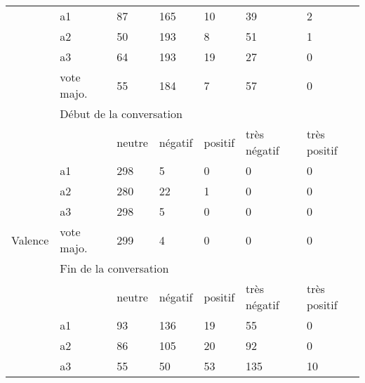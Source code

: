 \begin{table}[]
\begin{tabular}{|l|l|l|l|l|l|l|}
                                      & a1               & 87     & 165     & 10        & 39           & 2                 \\ \cline{2-7}
                                      & a2               & 50     & 193     & 8         & 51           & 1                 \\ \cline{2-7}
                                      & a3               & 64     & 193     & 19        & 27           & 0                 \\ \cline{2-7}
                                      & vote majo. & 55     & 184     & 7         & 57           & 0                 \\ \hline \hline
\multirow{18}{*}{Valence}             & \multicolumn{6}{l|}{Début de la conversation}                                      \\ \cline{2-7}
                                      &                  & neutre & négatif & positif   & très négatif & très positif      \\ \cline{2-7}
                                      & a1               & 298    & 5       & 0         & 0            & 0                 \\ \cline{2-7}
                                      & a2               & 280    & 22      & 1         & 0            & 0                 \\ \cline{2-7}
                                      & a3               & 298    & 5       & 0         & 0            & 0                 \\ \cline{2-7}
                                      & vote majo. & 299    & 4       & 0         & 0            & 0                 \\ \cline{2-7}
                                      & \multicolumn{6}{l|}{Fin de la conversation}                                        \\ \cline{2-7}
                                      &                  & neutre & négatif & positif   & très négatif & très positif      \\ \cline{2-7}
                                      & a1               & 93     & 136     & 19        & 55           & 0                 \\ \cline{2-7}
                                      & a2               & 86     & 105     & 20        & 92           & 0                 \\ \cline{2-7}
                                      & a3               & 55     & 50      & 53        & 135          & 10                \\ \cline{2-7}

\end{tabular}
\end{table}
